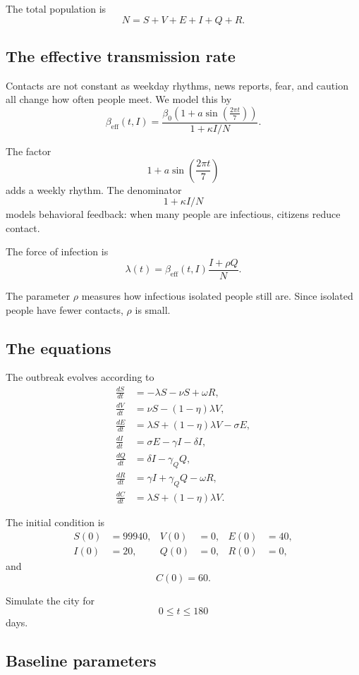\documentclass[11pt]{article}
\begin{document}
The total population is
\[
    N=S+V+E+I+Q+R.
\]

\subsection*{The effective transmission rate}

Contacts are not constant as weekday rhythms, news reports, fear, and caution all change how often people meet. We model this by
\[
\beta_{\mathrm{eff}}(t,I)
=
\frac{\beta_0\left(1+a\sin\left(\frac{2\pi t}{7}\right)\right)}{1+\kappa I/N}.
\]

The factor
\[
    1+a\sin\left(\frac{2\pi t}{7}\right)
\]
adds a weekly rhythm. The denominator
\[
    1+\kappa I/N
\]
models behavioral feedback: when many people are infectious, citizens reduce contact.

The force of infection is
\[
    \lambda(t)=\beta_{\mathrm{eff}}(t,I)\frac{I+\rho Q}{N}.
\]

The parameter $\rho$ measures how infectious isolated people still are. Since isolated people have fewer contacts, $\rho$ is small.

\subsection*{The equations}

The outbreak evolves according to
\begin{align*}
\frac{dS}{dt} &= -\lambda S - \nu S + \omega R, \\
\frac{dV}{dt} &= \nu S - (1-\eta)\lambda V, \\
\frac{dE}{dt} &= \lambda S + (1-\eta)\lambda V - \sigma E, \\
\frac{dI}{dt} &= \sigma E - \gamma I - \delta I, \\
\frac{dQ}{dt} &= \delta I - \gamma_Q Q, \\
\frac{dR}{dt} &= \gamma I + \gamma_Q Q - \omega R, \\
\frac{dC}{dt} &= \lambda S+(1-\eta)\lambda V.
\end{align*}

The initial condition is
\[
\begin{aligned}
S(0)&=99940, & V(0)&=0, & E(0)&=40, \\
I(0)&=20, & Q(0)&=0, & R(0)&=0,
\end{aligned}
\]
and
\[
    C(0)=60.
\]

Simulate the city for
\[
    0\leq t\leq 180
\]
days.

\subsection*{Baseline parameters}
\end{document}
